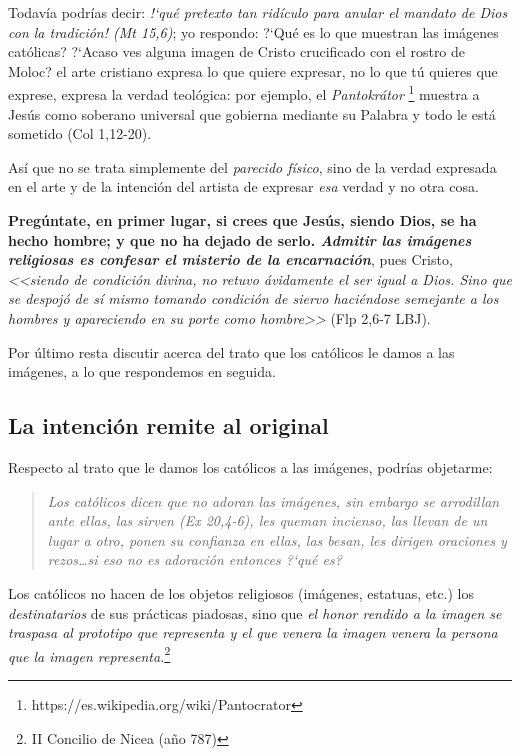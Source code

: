 \documentclass{article}
\begin{document}
Todav\'{i}a podr\'{i}as decir: \emph{!`qu\'e pretexto tan rid\'{i}culo para anular el mandato de Dios con la tradici\'on! (Mt 15,6)}; yo respondo: ?`Qu\'e es lo que muestran las im\'agenes cat\'olicas? ?`Acaso ves alguna imagen de Cristo crucificado con el rostro de Moloc? el arte cristiano expresa lo que quiere expresar, no lo que t\'u quieres que exprese, expresa la verdad teol\'ogica: por ejemplo, el \emph{Pantokr\'ator}%
    \footnote{https://es.wikipedia.org/wiki/Pantocrator}
muestra a Jes\'us como soberano universal que gobierna mediante su Palabra y todo le est\'a sometido (Col 1,12-20).

As\'{i} que no se trata simplemente del \emph{parecido f\'{i}sico}, sino de la verdad expresada en el arte y de la intenci\'on del artista de expresar \emph{esa} verdad y no otra cosa.

\textbf{Preg\'untate, en primer lugar, si crees que Jes\'us, siendo Dios, se ha hecho hombre; y que no ha dejado de serlo. \emph{Admitir las im\'agenes religiosas es confesar el misterio de la encarnaci\'on}}, pues Cristo, \emph{<<siendo de condición divina, no retuvo ávidamente el ser igual a Dios. Sino que se despojó de sí mismo tomando condición de siervo haciéndose semejante a los hombres y apareciendo en su porte como hombre>>} (Flp 2,6-7 LBJ).

Por \'ultimo resta discutir acerca del trato que los cat\'olicos le damos a las im\'agenes, a lo que respondemos en seguida.

\subsection{La intenci\'on remite al original}

Respecto al trato que le damos los cat\'olicos a las im\'agenes, podr\'{i}as objetarme:

\begin{quote}
\emph{Los cat\'olicos dicen que no adoran las im\'agenes, sin embargo se arrodillan ante ellas, las sirven (Ex 20,4-6), les queman incienso, las llevan de un lugar a otro, ponen su confianza en ellas, las besan, les dirigen oraciones y rezos\ldots si eso no es adoraci\'on entonces ?`qu\'e es?}
\end{quote}

\noindent
Los cat\'olicos no hacen de los objetos religiosos (im\'agenes, estatuas, etc.) los \emph{destinatarios} de sus pr\'acticas piadosas, sino que \emph{el honor rendido a la imagen se traspasa al prototipo que representa y el que venera la imagen venera la persona que la imagen representa.}\footnote{II Concilio de Nicea (a\~no 787)}
\end{document}
